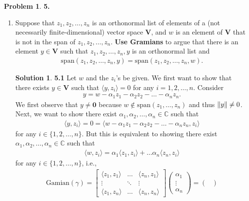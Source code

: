 \documentclass{article}
\theoremstyle{definition}
\newtheorem*{prob*}{Problem}
\newtheorem*{sln*}{Solution}
\newcommand{\V}{\mathbf{V}}
\newcommand{\xpan}{\text{span}}
\newcommand{\la}{\langle}
\newcommand{\ra}{\rangle}
\begin{document}
\begin{prob*}\textbf{5.}
	\begin{enumerate}
		\item Suppose that $z_1, z_2, \dots, z_n$ is an orthonormal list of elements of a (not necessarily finite-dimensional) vector space $\V$, and $w$ is an element of $\V$ that is not in the span of $z_1,z_2,\dots,z_n$. \textbf{Use Gramians} to argue that there is an element $y\in \V$ such that $z_1, z_2,\dots,z_n, y$ is an orthonormal list and
		\begin{align*}
		\xpan(z_1,z_2,\dots,z_n,y) = \xpan(z_1,z_2,\dots,z_n,w).
		\end{align*}
		
		
		\begin{sln*}\textbf{5.1}
			Let $w$ and the $z_i$'s be given. We first want to show that there exists $y\in \V$ such that $\la y,z_i\ra = 0$ for any $i=1,2,\dots,n$. Consider
			\begin{align*}
			y = w - \alpha_1 z_1 - \alpha_2 z_2 - \dots - \alpha_n z_n.
			\end{align*}
			We first observe that $y \neq \mathbf{0}$ because $w \notin \xpan(z_1,\dots,z_n)$ and thus $\norm{y} \neq 0$. Next, we want to show there exist $\alpha_1,\alpha_2,\dots,\alpha_n \in \mathbb{C}$ such that
			\begin{align*}
			\la y ,z_i \ra = 0 = \la w - \alpha_1 z_1 - \alpha_2 z_2 - \dots - \alpha_n z_n, z_i \ra
			\end{align*}
			 for any $i \in \{1,2,\dots,n\}$. But this is equivalent to showing there exist $\alpha_1,\alpha_2,\dots,\alpha_n \in \mathbb{C}$ such that
			 \begin{align*}
			 \la w ,z_i \ra = \alpha_1\la z_1,z_i \ra + \dots \alpha_n\la z_n,z_i \ra
			 \end{align*}
			 for any $i \in \{1,2,\dots,n \}$, i.e., 
			 \begin{align*}
			 \text{Gamian}(\gamma) = 
			 \begin{bmatrix}
			 \la z_1 , z_1 \ra & \dots & \la z_n,z_1 \ra\\
			  \vdots & \ddots&\vdots\\
			  \la z_1, z_n \ra & \dots & \la z_n,z_n \ra
			 \end{bmatrix}\begin{pmatrix}
			 \alpha_1 \\ \vdots \\ \alpha_n
			 \end{pmatrix} = \begin{pmatrix}

\end{pmatrix}
\end{align*}
\end{sln*}
\end{enumerate}
\end{prob*}
\end{document}
